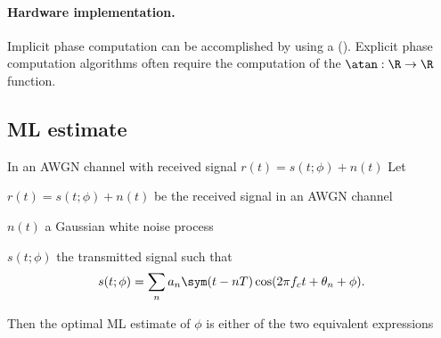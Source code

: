 \paragraph{Hardware implementation.}
Implicit phase computation can be accomplished by using a 
 ().
Explicit phase computation algorithms often require the computation
of the $\atan:\R\to\R$ function.


\subsection{ML estimate}
\begin{theorem}
\label{thm:estML_QAM}
In an AWGN channel with received signal $r(t)=s(t;\phi)+n(t)$
Let 
\begin{liste}
   \item $r(t)=s(t;\phi)+n(t)$ be the received signal in an AWGN channel
   \item $n(t)$ a Gaussian white noise process
   \item $s(t;\phi)$ the transmitted signal such that
       \[s(t;\phi) = \sum_n a_n \sym(t-nT)\cos(2\pi f_ct+\theta_n+\phi).\]
\end{liste}

Then the optimal ML estimate of $\phi$ is either of the two equivalent 
expressions
\end{theorem}
